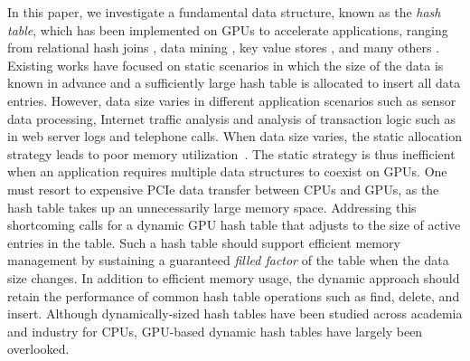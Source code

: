 In this paper, we investigate a fundamental data structure, known as the \emph{hash table}, which has been implemented on GPUs to accelerate applications, ranging from relational hash joins \cite{he2008relational,he2009relational,heimel2013hardware}, data mining \cite{pan2011fast,zhou2010parallel,zhong2014medusa},  key value stores \cite{zhang2015mega,hetherington2015memcachedgpu,breslow2016horton}, and many others \cite{bowers2010parallel,pan2010efficient,garcia2011coherent,niessner2013real,wu2015gpu}. Existing works \cite{alcantara2009real,zhang2015mega,hong2010mapcg,hetherington2015memcachedgpu,breslow2016horton} have focused on static scenarios in which the size of the data is known in advance and  a sufficiently large hash table is allocated to insert all data entries. 
However, data size varies in different application scenarios such as sensor data processing, Internet traffic analysis and analysis of transaction logic such as in web server logs and telephone calls. When data size varies, the static allocation strategy leads to poor memory utilization~\cite{ashkiani2018dynamic}. 
The static strategy is thus inefficient when an application requires multiple data structures to coexist on GPUs. One must resort to expensive PCIe data transfer between CPUs and GPUs, as the hash table takes up an unnecessarily large memory space. 
Addressing this shortcoming calls for a dynamic GPU hash table that adjusts to the size of active entries in the table. 
Such a hash table should support efficient memory management by sustaining a guaranteed \emph{filled factor} of the table when the data size changes. 
In addition to efficient memory usage, the dynamic approach should retain the performance of common hash table operations such as find, delete, and insert.
Although dynamically-sized hash tables have been studied across academia \cite{liu2014dynamic,zuo2018write} and industry \cite{larson2003scaleable,douceur2000hash} for CPUs, 
GPU-based dynamic hash tables have largely been overlooked.

